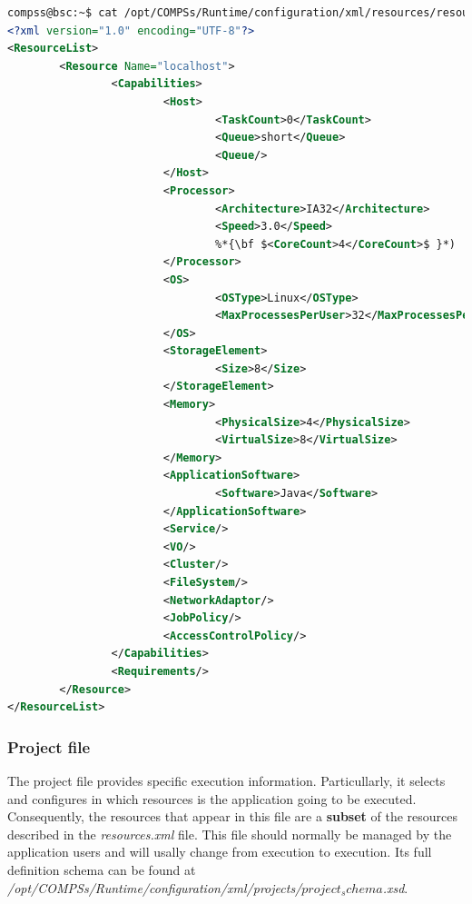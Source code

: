 \begin{lstlisting}[language=xml]
compss@bsc:~$ cat /opt/COMPSs/Runtime/configuration/xml/resources/resources.xml
<?xml version="1.0" encoding="UTF-8"?>
<ResourceList>
        <Resource Name="localhost">
                <Capabilities>
                        <Host>
                                <TaskCount>0</TaskCount>
                                <Queue>short</Queue>
                                <Queue/>
                        </Host>
                        <Processor>
                                <Architecture>IA32</Architecture>
                                <Speed>3.0</Speed>
                                %*{\bf $<CoreCount>4</CoreCount>$ }*)
                        </Processor>
                        <OS>
                                <OSType>Linux</OSType>
                                <MaxProcessesPerUser>32</MaxProcessesPerUser>
                        </OS>
                        <StorageElement>
                                <Size>8</Size>
                        </StorageElement>
                        <Memory>
                                <PhysicalSize>4</PhysicalSize>
                                <VirtualSize>8</VirtualSize>
                        </Memory>
                        <ApplicationSoftware>
                                <Software>Java</Software>
                        </ApplicationSoftware>
                        <Service/>
                        <VO/>
                        <Cluster/>
                        <FileSystem/>
                        <NetworkAdaptor/>
                        <JobPolicy/>
                        <AccessControlPolicy/>
                </Capabilities>
                <Requirements/>
        </Resource>
</ResourceList>
\end{lstlisting}


\subsubsection{Project file}
The project file provides specific execution information. Particullarly, it selects and configures in which resources
is the application going to be executed. Consequently, the resources that appear in this file are a \textbf{subset} of the 
resources described in the \textit{resources.xml} file. This file should normally be managed by the application users and will
usally change from execution to execution. Its full definition schema can be found at 
\emph{/opt/COMPSs/Runtime/configuration/xml/projects/$project_schema$.xsd}.

